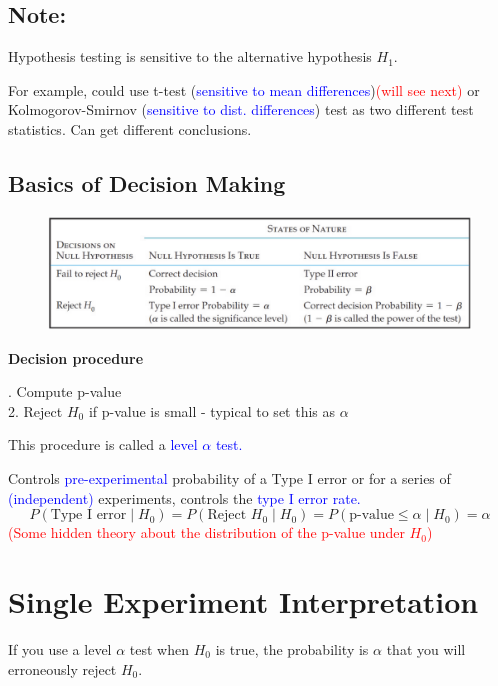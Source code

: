 \documentclass[14pt]{extarticle}
\begin{document}
\subsection*{Note:}

Hypothesis testing is sensitive to the alternative hypothesis \(H_1\).

For example, could use t-test (\textcolor{blue}{sensitive to mean differences})\textcolor{red}{(will see next)} or Kolmogorov-Smirnov (\textcolor{blue}{sensitive to dist. differences}) test as two different test statistics. Can get different conclusions.

\subsection*{Basics of Decision Making}
\begin{figure}[H]
    \centering
    \includegraphics[width=1\textwidth]{fig3.png}
\end{figure}

\textbf{Decision procedure}

. Compute p-value \\ 
2. Reject \( H_0 \) if p-value is small - typical to set this as \( \alpha \)
\vspace{0.5cm}

\noindent This procedure is called a \textcolor{blue}{level \( \alpha \) test.}

\noindent Controls \textcolor{blue}{pre-experimental} probability of a Type I error or for a series of \textcolor{blue}{(independent)} experiments, controls the \textcolor{blue}{type I error rate.}
\[
P(\text{Type I error} \mid H_0) = P(\text{Reject } H_0 \mid H_0) = P(\text{p-value} \leq \alpha \mid H_0) = \alpha
\]
\noindent \textcolor{red}{(Some hidden theory about the distribution of the p-value under \( H_0 \))}

\section*{Single Experiment Interpretation}

If you use a level \( \alpha \) test when \( H_0 \) is true, the probability is \( \alpha \) that you will erroneously reject \( H_0 \).
\end{document}
